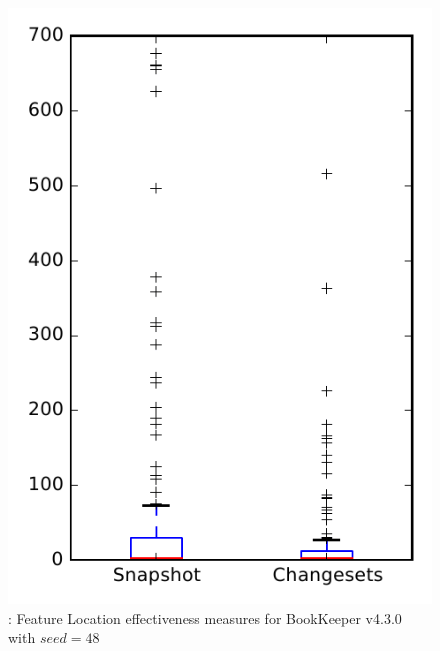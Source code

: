 
\begin{figure}
\centering
\includegraphics[height=0.4\textheight]{figures/flt_seed/rq1_bookkeeper_48}
\caption{\rone: Feature Location effectiveness measures for BookKeeper v4.3.0 with $seed=48$}
\label{fig:flt_seed:rq1:bookkeeper}
\end{figure}
